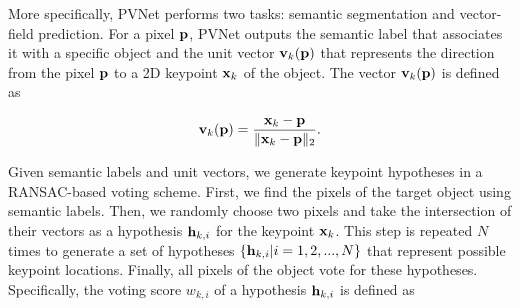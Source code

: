 \documentclass[10pt,twocolumn,letterpaper]{article}
\begin{document}

More specifically, PVNet performs two tasks: semantic segmentation and vector-field prediction. For a pixel ${\bf p}$, PVNet outputs the semantic label that associates it with a specific object and the unit vector ${\bf v}_k({\bf p})$ that represents the direction from the pixel $\bf p$ to a 2D keypoint ${\bf x}_k$ of the object. The vector ${\bf v}_k({\bf p})$ is defined as

\begin{equation}
    {\bf v}_k({\bf p}) =  \frac{{\bf x}_k - {\bf p}}{\|{\bf x}_k - {\bf p}\|_2}.
\end{equation}%

Given semantic labels and unit vectors, we generate keypoint hypotheses in a RANSAC-based voting scheme. First, we find the pixels of the target object using semantic labels. Then, we randomly choose two pixels and take the intersection of their vectors as a hypothesis ${\bf h}_{k,i}$ for the keypoint ${\bf x}_k$. This step is repeated $N$ times to generate a set of hypotheses $\{{\bf h}_{k,i} |i = 1,2,...,N\}$ that represent possible keypoint locations. Finally, all pixels of the object vote for these hypotheses. Specifically, the voting score $w_{k,i}$ of a hypothesis ${\bf h}_{k,i}$ is defined as
\end{document}
